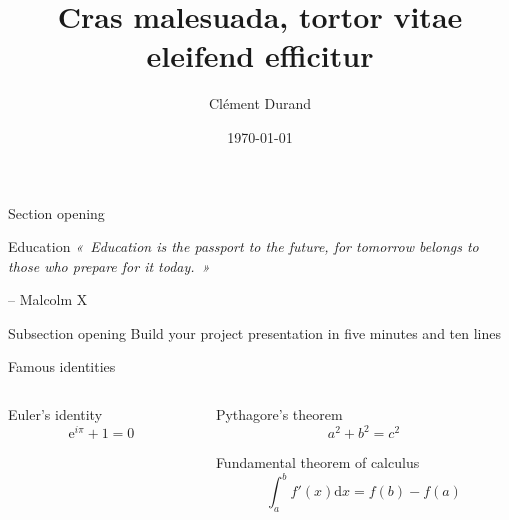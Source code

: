 \documentclass[aspectratio=169,leqno]{beamer}
\title[Vestibulum sed nulla congue, molestie magna quis, congue tellus.]        %
      {Cras malesuada, tortor vitae eleifend efficitur}                         %
      [Cras malesuada]                                                          %
\author{Clément Durand}                                                         %
\date{\today}                                                                   %
\begin{document}
  \maketitle%

           {Section opening}                                                    %

  \begin{frame}{Education}
    \textit{«~Education is the passport to the future, for tomorrow belongs to those who prepare for it today.~»}

    \flushright-- Malcolm X
  \end{frame}

              {Subsection opening}                                              %
              {Build your project presentation in five minutes and ten lines}   %

  \begin{frame}[c]{Famous identities}
    \begin{columns}[t]

      \begin{column}{0.3\textwidth}

        \begin{block}{Euler's identity}
          \begin{equation*}
            \mathrm{e}^{i\pi} + 1 = 0
          \end{equation*}
        \end{block}

      \end{column}

      \begin{column}{0.65\textwidth}

        \begin{block}{Pythagore's theorem}
          \begin{equation*}
            a^2+b^2 = c^2
          \end{equation*}
        \end{block}

        \begin{block}{Fundamental theorem of calculus}
          \begin{equation*}
            \int_a^b{f'(x)\mathrm{d}x} = f(b)-f(a)
          \end{equation*}
        \end{block}

      \end{column}

    \end{columns}

  \end{frame}
\end{document}
